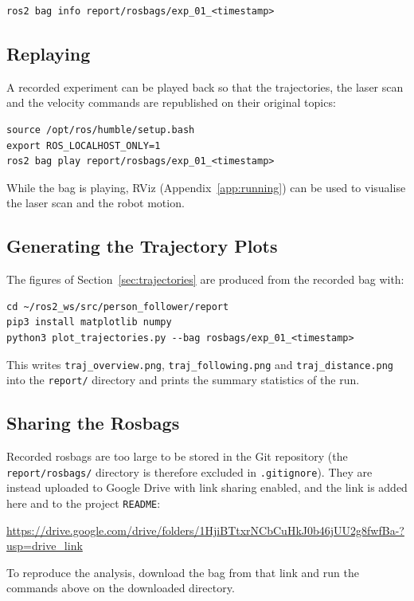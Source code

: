 \documentclass[12pt,a4paper]{article}
\begin{document}
\begin{verbatim}
ros2 bag info report/rosbags/exp_01_<timestamp>
\end{verbatim}

\subsection{Replaying}

A recorded experiment can be played back so that the trajectories, the laser
scan and the velocity commands are republished on their original topics:

\begin{verbatim}
source /opt/ros/humble/setup.bash
export ROS_LOCALHOST_ONLY=1
ros2 bag play report/rosbags/exp_01_<timestamp>
\end{verbatim}

While the bag is playing, RViz (Appendix~\ref{app:running}) can be used to
visualise the laser scan and the robot motion.

\subsection{Generating the Trajectory Plots}

The figures of Section~\ref{sec:trajectories} are produced from the recorded
bag with:

\begin{verbatim}
cd ~/ros2_ws/src/person_follower/report
pip3 install matplotlib numpy
python3 plot_trajectories.py --bag rosbags/exp_01_<timestamp>
\end{verbatim}

This writes \texttt{traj\_overview.png}, \texttt{traj\_following.png} and
\texttt{traj\_distance.png} into the \texttt{report/} directory and prints the
summary statistics of the run.

\subsection{Sharing the Rosbags}

Recorded rosbags are too large to be stored in the Git repository (the
\texttt{report/rosbags/} directory is therefore excluded in
\texttt{.gitignore}). They are instead uploaded to Google Drive with link
sharing enabled, and the link is added here and to the project
\texttt{README}:

\begin{center}
\url{https://drive.google.com/drive/folders/1HjiBTtxrNCbCuHkJ0b46jUU2g8fwfBa-?usp=drive_link}
\end{center}

\noindent To reproduce the analysis, download the bag from that link and run
the commands above on the downloaded directory.
\end{document}
